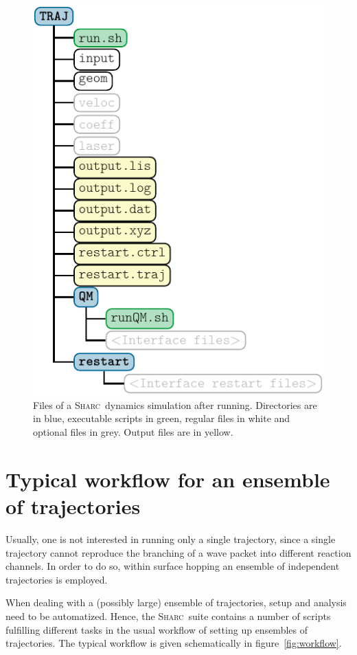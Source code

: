 \documentclass[a4paper,10pt,DIV=15,openany,twoside=false]{scrbook}
\newcommand{\sharc}{\textsc{Sharc}}
\begin{document}
\begin{figure}[htb]
  \centering
  \includegraphics[scale=1]{img/dir_traj/dir_traj_after.pdf}
  \caption{Files of a \sharc\ dynamics simulation after running. Directories are in blue, executable scripts in green, regular files in white and optional files in grey. Output files are in yellow.}
  \label{fig:dir_traj_after}
\end{figure}




\section{Typical workflow for an ensemble of trajectories}

Usually, one is not interested in running only a single trajectory, since a single trajectory cannot reproduce the branching of a wave packet into different reaction channels. In order to do so, within surface hopping an ensemble of independent trajectories is employed. 

When dealing with a (possibly large) ensemble of trajectories, setup and analysis need to be automatized. Hence, the \sharc\ suite contains a number of scripts fulfilling different tasks in the usual workflow of setting up ensembles of trajectories.
The typical workflow is given schematically in figure~\ref{fig:workflow}.
\end{document}

